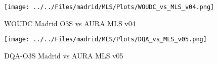                                 \begin{figure}
        \centering
\texttt{[image: ../../Files/madrid/MLS/Plots/WOUDC\_vs\_MLS\_v04.png]}
    \caption{ WOUDC Madrid O3S vs AURA MLS v04  }
            \label{fig:ndaccv04}
    \end{figure}


                                \begin{figure}
        \centering
\texttt{[image: ../../Files/madrid/MLS/Plots/DQA\_vs\_MLS\_v05.png]}
    \caption{DQA-O3S Madrid vs AURA MLS v05 }
            \label{fig:o3sv04}
    \end{figure}








%
%

